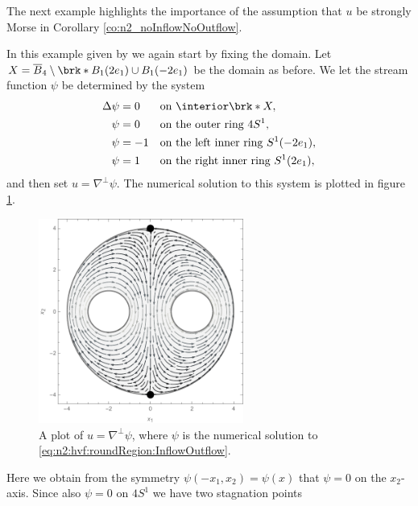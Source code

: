 The next example highlights the importance of the assumption that $u$ be strongly Morse in Corollary \ref{co:n2_noInflowNoOutflow}.
\begin{example}\label{ex:n2_noInflowOutflow_irregular}
  In this example given by \cite{Wahlen2023} we again start by fixing the domain.
  Let $X=\overline{B}_4\setminus\brk*{B_1(2e_1)\cup B_1(-2e_1)}$ be the domain as before.
  We let the stream function $\psi$ be determined by the system
  \begin{equation}
    \begin{aligned}
      \Delta \psi&=0 &&\text{on }\openX, \\
      \psi&=0 &&\text{on the outer ring }4S^1, \\
      \psi&=-1 &&\text{on the left inner ring }S^1(-2e_1), \\
      \psi&=1 &&\text{on the right inner ring }S^1(2e_1),
    \end{aligned}\label{eq:n2:hvf:roundRegion:InflowOutflow}
  \end{equation}
  and then set $u=\nabla^\perp\psi$.
  The numerical solution to this system is plotted in figure \ref{pl:n2_hvf_roundRegion_InflowOutflow}.
  \begin{figure}[h]
    \centering
    \includegraphics[width=0.6\textwidth]{../Plots/n2_hvf_roundRegion_InflowOutflow_gray_2.pdf}
    \caption{A plot of $u=\nabla^\perp\psi$, where $\psi$ is the numerical solution to
    \eqref{eq:n2:hvf:roundRegion:InflowOutflow}.}
    \label{pl:n2_hvf_roundRegion_InflowOutflow}
  \end{figure}
  Here we obtain from the symmetry $\psi(-x_1,x_2)=\psi(x)$ that $\psi=0$ on
  the $x_2$-axis. Since also $\psi=0$ on $4S^1$ we have two stagnation points

\end{example}
